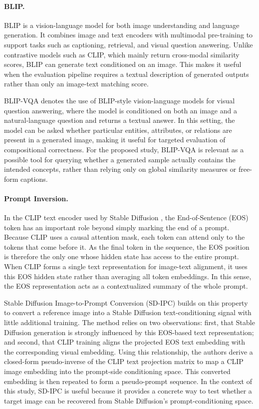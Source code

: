 \paragraph{BLIP.} BLIP \citep{li2022blip} is a vision-language model for both image understanding and language generation. 
It combines image and text encoders with multimodal pre-training to support tasks such as captioning, retrieval, and visual question answering. 
Unlike contrastive models such as CLIP, which mainly return cross-modal similarity scores, BLIP can generate text conditioned on an image. This makes it useful when the evaluation pipeline requires a textual description of generated outputs rather than only an image-text matching score.

BLIP-VQA denotes the use of BLIP-style vision-language models for visual question answering, where the model is conditioned on both an image and a natural-language question and returns a textual answer. 
In this setting, the model can be asked whether particular entities, attributes, or relations are present in a generated image, making it useful for targeted evaluation of compositional correctness. 
For the proposed study, BLIP-VQA is relevant as a possible tool for querying whether a generated sample actually contains the intended concepts, rather than relying only on global similarity measures or free-form captions.

\paragraph{Prompt Inversion.}
In the CLIP \citep{radford2019language} text encoder used by Stable Diffusion \citep{rombach2022high, podell2023sdxl}, the End-of-Sentence (EOS) token has an important role beyond simply marking the end of a prompt. 
Because CLIP uses a causal attention mask, each token can attend only to the tokens that come before it. 
As the final token in the sequence, the EOS position is therefore the only one whose hidden state has access to the entire prompt. 
When CLIP forms a single text representation for image-text alignment, it uses this EOS hidden state rather than averaging all token embeddings. 
In this sense, the EOS representation acts as a contextualized summary of the whole prompt.

Stable Diffusion Image-to-Prompt Conversion (SD-IPC) \citep{the_clip_model_is_secretly_an_image_to_prompt_converter} builds on this property to convert a reference image into a Stable Diffusion text-conditioning signal with little additional training. 
The method relies on two observations: first, that Stable Diffusion generation is strongly influenced by this EOS-based text representation; and second, that CLIP training aligns the projected EOS text embedding with the corresponding visual embedding. 
Using this relationship, the authors derive a closed-form pseudo-inverse of the CLIP text projection matrix to map a CLIP image embedding into the prompt-side conditioning space. 
This converted embedding is then repeated to form a pseudo-prompt sequence. 
In the context of this study, SD-IPC is useful because it provides a concrete way to test whether a target image can be recovered from Stable Diffusion's prompt-conditioning space.